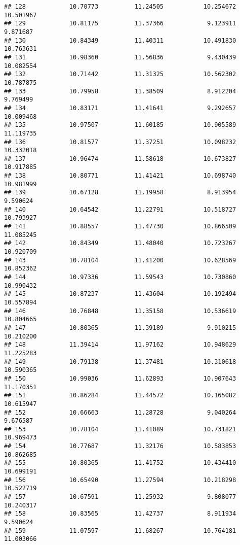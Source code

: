 \documentclass[
]{article}
\begin{document}
\begin{verbatim}
## 128            10.70773          11.24505           10.254672         10.501967
## 129            10.81175          11.37366            9.123911          9.871687
## 130            10.84349          11.40311           10.491830         10.763631
## 131            10.98360          11.56836            9.430439         10.082554
## 132            10.71442          11.31325           10.562302         10.787875
## 133            10.79958          11.38509            8.912204          9.769499
## 134            10.83171          11.41641            9.292657         10.009468
## 135            10.97507          11.60185           10.905589         11.119735
## 136            10.81577          11.37251           10.098232         10.332018
## 137            10.96474          11.58618           10.673827         10.917885
## 138            10.80771          11.41421           10.698740         10.981999
## 139            10.67128          11.19958            8.913954          9.590624
## 140            10.64542          11.22791           10.518727         10.793927
## 141            10.88557          11.47730           10.866509         11.085245
## 142            10.84349          11.48040           10.723267         10.920709
## 143            10.78104          11.41200           10.628569         10.852362
## 144            10.97336          11.59543           10.730860         10.990432
## 145            10.87237          11.43604           10.192494         10.557894
## 146            10.76848          11.35158           10.536619         10.804665
## 147            10.80365          11.39189            9.910215         10.210200
## 148            11.39414          11.97162           10.948629         11.225283
## 149            10.79138          11.37481           10.310618         10.590365
## 150            10.99036          11.62893           10.907643         11.170351
## 151            10.86284          11.44572           10.165082         10.615947
## 152            10.66663          11.28728            9.040264          9.676587
## 153            10.78104          11.41089           10.731821         10.969473
## 154            10.77687          11.32176           10.583853         10.862685
## 155            10.80365          11.41752           10.434410         10.699191
## 156            10.65490          11.27594           10.218298         10.522719
## 157            10.67591          11.25932            9.808077         10.240317
## 158            10.83565          11.42737            8.911934          9.590624
## 159            11.07597          11.68267           10.764181         11.003066

\end{verbatim}
\end{document}
